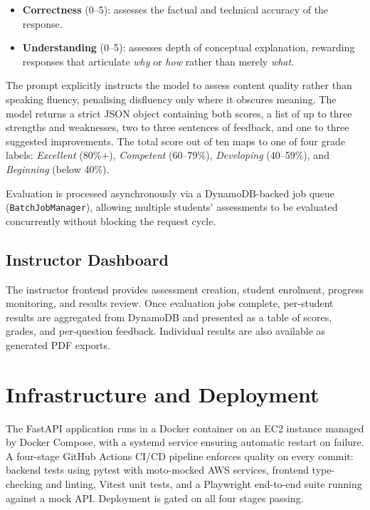 \begin{itemize}
    \item \textbf{Correctness} (0--5): assesses the factual and technical accuracy of the response.
    \item \textbf{Understanding} (0--5): assesses depth of conceptual explanation, rewarding responses that articulate \textit{why} or \textit{how} rather than merely \textit{what}.
\end{itemize}

The prompt explicitly instructs the model to assess content quality rather than speaking fluency, penalising disfluency only where it obscures meaning. The model returns a strict JSON object containing both scores, a list of up to three strengths and weaknesses, two to three sentences of feedback, and one to three suggested improvements. The total score out of ten maps to one of four grade labels: \textit{Excellent} (80\%+), \textit{Competent} (60--79\%), \textit{Developing} (40--59\%), and \textit{Beginning} (below 40\%).

Evaluation is processed asynchronously via a DynamoDB-backed job queue (\texttt{BatchJobManager}), allowing multiple students' assessments to be evaluated concurrently without blocking the request cycle.

\subsection{Instructor Dashboard}

The instructor frontend provides assessment creation, student enrolment, progress monitoring, and results review. Once evaluation jobs complete, per-student results are aggregated from DynamoDB and presented as a table of scores, grades, and per-question feedback. Individual results are also available as generated PDF exports.

\section{Infrastructure and Deployment}

The FastAPI application runs in a Docker container on an EC2 instance managed by Docker Compose, with a systemd service ensuring automatic restart on failure. A four-stage GitHub Actions CI/CD pipeline enforces quality on every commit: backend tests using pytest with moto-mocked AWS services, frontend type-checking and linting, Vitest unit tests, and a Playwright end-to-end suite running against a mock API. Deployment is gated on all four stages passing.

